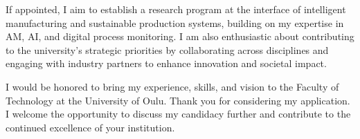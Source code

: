 \documentclass[10pt,a4paper,roman]{moderncv}
\begin{document}
If appointed, I aim to establish a research program at the interface of intelligent manufacturing and sustainable production systems, building on my expertise in AM, AI, and digital process monitoring. I am also enthusiastic about contributing to the university’s strategic priorities by collaborating across disciplines and engaging with industry partners to enhance innovation and societal impact.

I would be honored to bring my experience, skills, and vision to the Faculty of Technology at the University of Oulu. Thank you for considering my application. I welcome the opportunity to discuss my candidacy further and contribute to the continued excellence of your institution.

\vspace{0.5cm}

\makeletterclosing
\end{document}
